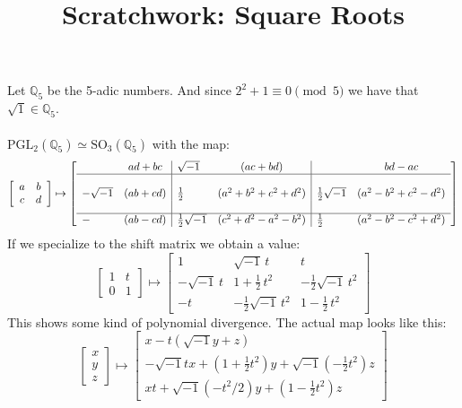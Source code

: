 \documentclass[12pt]{article}
\title{Scratchwork: Square Roots}
\date{}
\begin{document}

\sffamily

\maketitle

\noindent Let $\mathbb{Q}_5$ be the 5-adic numbers.  And since $2^2 + 1 \equiv 0 \pmod 5$ we have that $\sqrt{1} \in \mathbb{Q}_5$. \\ \\
$\text{PGL}_2(\mathbb{Q}_5)\simeq \text{SO}_3(\mathbb{Q}_5)$ with the map:
$$ \left[
\begin{array}{cc} a & b \\ c & d \end{array}
 \right] \mapsto
 \left[
\begin{array}{lc|lc|lc} & ad+bc & \sqrt{-1} &(ac+bd)& & bd-ac \\ \hline
& & & \\
 -\sqrt{-1}& (ab+cd) & \frac{1}{2}&(a^2 + b^2 + c^2 + d^2) &  \frac{1}{2}\sqrt{-1}& (a^2 - b^2 + c^2 - d^2) \\ 
 & & & \\ \hline
 -& (ab-cd) & \frac{1}{2}\sqrt{-1}&(c^2 + d^2 - a^2 - b^2) & \frac{1}{2}& (a^2 - b^2 - c^2 + d^2 ) \end{array}
 \right]   
  $$
If we specialize to the shift matrix we obtain a value:
$$
\left[
\begin{array}{cc} 1 & t \\ 0 & 1 \end{array}
 \right] \mapsto
  \left[
\begin{array}{rrr} 1 & \sqrt{-1} \,t & t \\
- \sqrt{-1}\,t & 1 + \frac{1}{2}\,t^2 & -\frac{1}{2}\sqrt{-1} \, t^2 \\
-t & -\frac{1}{2}\sqrt{-1}\,t^2 & 1 - \frac{1}{2}\,t^2 \end{array}
 \right]   
 $$
This shows some kind of polynomial divergence.  The actual map looks like this:
$$
\left[
\begin{array}{c} 
x \\
y \\ 
z \end{array} \right] \mapsto
\left[
\begin{array}{c} 
x  - t(\sqrt{-1} y + z)\\
-\sqrt{-1} t x + (1 + \frac{1}{2}t^2) y + \sqrt{-1}(- \frac{1}{2}t^2)z \\  
xt + \sqrt{-1}(- t^2/2)y + (1 - \frac{1}{2}t^2)z  \end{array} \right] $$
\end{document}
